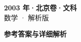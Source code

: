 \documentclass[zihao=-4, a4paper]{ctexart}
\begin{document}
\begin{center}
  {\Large\bfseries 2003 年·北京卷·文科}\\[4pt]
  {\large 数学 · 解析版}
\end{center}
\medskip
{}

\clearpage
{}
\begin{center}{\Large\bfseries 参考答案与详细解析}\end{center}
\medskip

\end{document}
